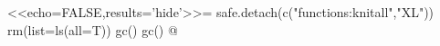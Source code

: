 
\begin{Rnw}
<<echo=FALSE,results='hide'>>=
safe.detach(c("functions:knitall","XL"))
rm(list=ls(all=T)) 
gc() 
gc() 
@ 
\end{Rnw}

